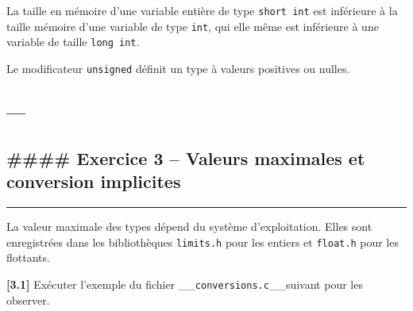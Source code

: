 \documentclass[11pt]{article}
\begin{document}
La taille en mémoire d'une variable entière de type \texttt{short\ int}
est inférieure à la taille mémoire d'une variable de type \texttt{int},
qui elle même est inférieure à une variable de taille
\texttt{long\ int}.

Le modificateur \texttt{unsigned} définit un type à valeurs positives ou
nulles.

    \hypertarget{section}{%
\subsection{---}\label{section}}

\hypertarget{exercice-3-valeurs-maximales-et-conversion-implicites}{%
\subsection{\#\#\#\# Exercice 3 -- Valeurs maximales et conversion
implicites}\label{exercice-3-valeurs-maximales-et-conversion-implicites}}

\begin{center}\rule{0.5\linewidth}{0.5pt}\end{center}

La valeur maximale des types dépend du système d'exploitation. Elles
sont enregistrées dans les bibliothèques \texttt{limits.h} pour les
entiers et \texttt{float.h} pour les flottants.

\textbf{{[}3.1{]}} Exécuter l'exemple du fichier
\_\_\texttt{conversions.c}\_\_suivant pour les observer.
\end{document}
